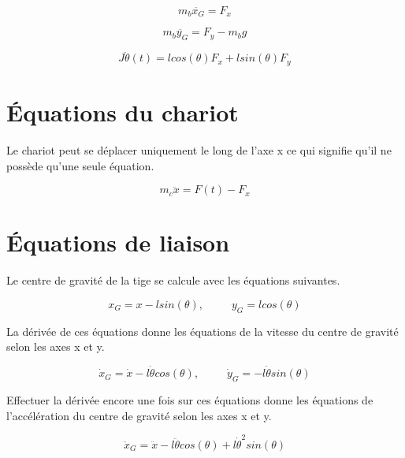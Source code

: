 \begin{equation}\label{eq:SecondNewtX}
    m_b\ddot{x_G} = F_x
\end{equation}

\begin{equation}\label{eq:SecondNewtY}
    m_b\ddot{y_G} = F_y - m_bg
\end{equation}

\begin{equation}\label{eq:SecondNewtMom}
    J\ddot{\theta}(t) = lcos(\theta)F_x + lsin(\theta)F_y
\end{equation}

\section{Équations du chariot}\label{sec:EqChar}
Le chariot peut se déplacer uniquement le long de l'axe x ce qui signifie qu'il ne possède qu'une seule équation.

\begin{equation}\label{eq:SecondNewtX2}
    m_c\ddot{x} = F(t) - F_x
\end{equation}

\section{Équations de liaison}\label{sec:EqLiaison}
Le centre de gravité de la tige se calcule avec les équations suivantes.

\begin{equation*}
    x_G = x - lsin(\theta), \hspace{30pt} y_G = lcos(\theta)
\end{equation*}

La dérivée de ces équations donne les équations de la vitesse du centre de gravité selon les axes x et y.

\begin{equation*}
    \dot{x}_G = \dot{x} - l\dot{\theta}cos(\theta), \hspace{30pt} \dot{y}_G = -l\dot{\theta}sin(\theta)
\end{equation*}

Effectuer la dérivée encore une fois sur ces équations donne les équations de l'accélération du centre de gravité selon les axes x et y.

\begin{equation}\label{eq:SecondNewtXG}
    \ddot{x}_G = \ddot{x} - l\ddot{\theta}cos(\theta) + l\dot{\theta}^2sin(\theta)
\end{equation}

